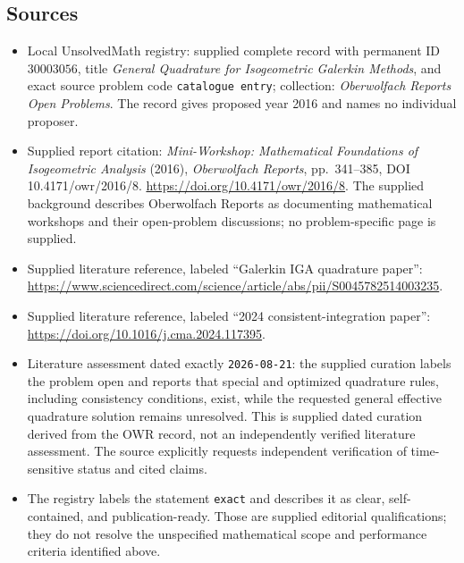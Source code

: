 \documentclass[11pt]{article}
\begin{document}
\subsection{Sources}
\begin{itemize}
\item Local UnsolvedMath registry: supplied complete record with permanent ID \(30003056\), title \emph{General Quadrature for Isogeometric Galerkin Methods}, and exact source problem code \texttt{catalogue entry}; collection: \emph{Oberwolfach Reports Open Problems}. The record gives proposed year 2016 and names no individual proposer.
\item Supplied report citation: \emph{Mini-Workshop: Mathematical Foundations of Isogeometric Analysis} (2016), \emph{Oberwolfach Reports}, pp.~341--385, DOI 10.4171/owr/2016/8. \url{https://doi.org/10.4171/owr/2016/8}. The supplied background describes Oberwolfach Reports as documenting mathematical workshops and their open-problem discussions; no problem-specific page is supplied.
\item Supplied literature reference, labeled ``Galerkin IGA quadrature paper'': \url{https://www.sciencedirect.com/science/article/abs/pii/S0045782514003235}.
\item Supplied literature reference, labeled ``2024 consistent-integration paper'': \url{https://doi.org/10.1016/j.cma.2024.117395}.
\item Literature assessment dated exactly \texttt{2026-08-21}: the supplied curation labels the problem open and reports that special and optimized quadrature rules, including consistency conditions, exist, while the requested general effective quadrature solution remains unresolved. This is supplied dated curation derived from the OWR record, not an independently verified literature assessment. The source explicitly requests independent verification of time-sensitive status and cited claims.
\item The registry labels the statement \texttt{exact} and describes it as clear, self-contained, and publication-ready. Those are supplied editorial qualifications; they do not resolve the unspecified mathematical scope and performance criteria identified above.
\end{itemize}
\end{document}
